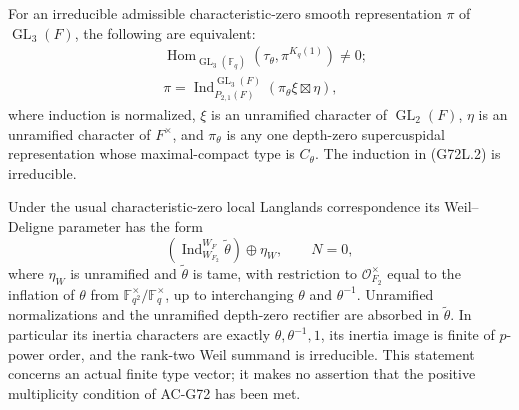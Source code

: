 \begin{proposition}
\label{AC-G72-local}
For an irreducible admissible characteristic-zero smooth
representation $\pi$ of $\operatorname{GL}_3(F)$, the following
are equivalent:
\[
\begin{split}
 &\operatorname{Hom}_{\operatorname{GL}_3(\mathbb F_q)}
       (\tau_\theta,\pi^{K_q(1)})\ne0;\\
 &\pi=\operatorname{Ind}_{P_{2,1}(F)}^{\operatorname{GL}_3(F)}
                  (\pi_\theta\xi\boxtimes\eta),
\end{split}                                                   \tag{G72L.2}
\]
where induction is normalized, $\xi$ is an unramified character
of $\operatorname{GL}_2(F)$, $\eta$ is an unramified character
of $F^\times$, and $\pi_\theta$ is any one depth-zero
supercuspidal representation whose maximal-compact type is
$C_\theta$.  The induction in (G72L.2) is irreducible.

Under the usual characteristic-zero local Langlands
correspondence its Weil--Deligne parameter has the form
\[
       \left(\operatorname{Ind}_{W_{F_2}}^{W_F}
                       \widetilde\theta\right)\oplus\eta_W,
                         \qquad N=0,                        \tag{G72L.3}
\]
where $\eta_W$ is unramified and $\widetilde\theta$ is tame,
with restriction to $\mathcal O_{F_2}^{\times}$ equal to the
inflation of $\theta$ from
$\mathbb F_{q^2}^{\times}/\mathbb F_q^{\times}$, up to
interchanging $\theta$ and $\theta^{-1}$.  Unramified
normalizations and the unramified depth-zero rectifier are
absorbed in $\widetilde\theta$.  In particular its inertia
characters are exactly $\theta,\theta^{-1},1$, its inertia
image is finite of $p$-power order, and the rank-two Weil
summand is irreducible.  This statement concerns an actual
finite type vector; it makes no assertion that the positive
multiplicity condition of AC-G72 has been met.
\end{proposition}
